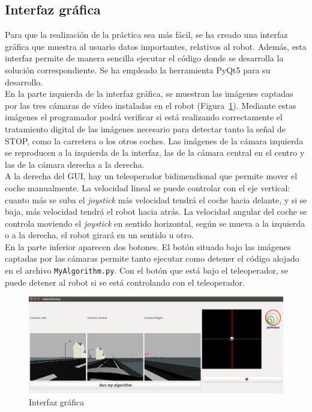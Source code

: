 \subsection{Interfaz gráfica}
Para que la realización de la práctica sea más fácil, se ha creado una interfaz gráfica que muestra al usuario datos importantes, relativos al robot. Además, esta interfaz permite de manera sencilla ejecutar el código donde se desarrolla la solución correspondiente. Se ha empleado la herramienta PyQt5 para su desarrollo.\\

En la parte izquierda de la interfaz gráfica, se muestran las imágenes captadas por las tres cámaras de vídeo instaladas en el robot (Figura~\ref{fig.stopGUI}). Mediante estas imágenes el programador podrá verificar si está realizando correctamente el tratamiento digital de las imágenes necesario para detectar tanto la señal de STOP, como la carretera o los otros coches. Las imágenes de la cámara izquierda se reproducen a la izquierda de la interfaz, las de la cámara central en el centro y las de la cámara derecha a la derecha.\\

A la derecha del GUI, hay un teleoperador bidimendional que permite mover el coche manualmente. La velocidad lineal se puede controlar con el eje vertical: cuanto más se suba el \textit{joystick} más velocidad tendrá el coche hacia delante, y si se baja, más velocidad tendrá el robot hacia atrás. La velocidad angular del coche se controla moviendo el \textit{joystick} en sentido horizontal, según se mueva a la izquierda o a la derecha, el robot girará en un sentido u otro.\\

En la parte inferior aparecen dos botones. El botón situado bajo las imágenes captadas por las cámaras permite tanto ejecutar como detener el código alojado en el archivo \texttt{MyAlgorithm.py}. Con el botón que está bajo el teleoperador, se puede detener al robot si se está controlando con el teleoperador. \\


\begin{figure}[H]
  \begin{center}
    \includegraphics[width=1.0\textwidth]{figures/Stop/stopGUI.png}
		\caption{Interfaz gráfica}
		\label{fig.stopGUI}
		\end{center}
\end{figure}


